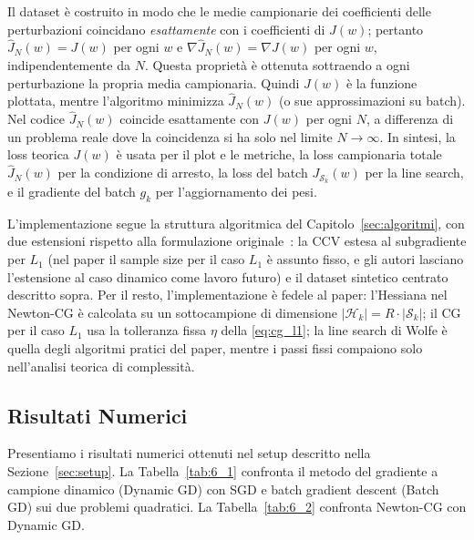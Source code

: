 \documentclass[a4paper,12pt]{article}
\numberwithin{equation}{section}
\numberwithin{figure}{section}
\numberwithin{table}{section}
\begin{document}
Il dataset è costruito in modo che le medie campionarie dei coefficienti
delle perturbazioni coincidano \emph{esattamente} con i coefficienti di
$J(w)$; pertanto $\hat J_N(w) = J(w)$ per ogni $w$ e
$\nabla \hat J_N(w) = \nabla J(w)$ per ogni $w$, indipendentemente da $N$.
Questa proprietà è ottenuta sottraendo a ogni perturbazione la propria media
campionaria. Quindi $J(w)$ è la funzione plottata, mentre l'algoritmo
minimizza $\hat J_N(w)$ (o sue approssimazioni su batch). Nel codice
$\hat J_N(w)$ coincide esattamente con $J(w)$ per ogni $N$, a differenza di
un problema reale dove la coincidenza si ha solo nel limite $N \to \infty$.
In sintesi, la loss teorica $J(w)$ è usata per il plot e le metriche, la loss
campionaria totale $\hat J_N(w)$ per la condizione di arresto, la loss del
batch $J_{\mathcal{S}_k}(w)$ per la line search, e il gradiente del batch
$g_k$ per l'aggiornamento dei pesi.

L'implementazione segue la struttura algoritmica del
Capitolo~\ref{sec:algoritmi}, con due estensioni rispetto alla formulazione
originale~\cite{byrd2012}: la CCV estesa al subgradiente per $L_1$ (nel
paper il sample size per il caso $L_1$ è assunto fisso, e gli autori
lasciano l'estensione al caso dinamico come lavoro futuro) e il dataset
sintetico centrato descritto sopra. Per il resto, l'implementazione è fedele
al paper: l'Hessiana nel Newton-CG è calcolata su un sottocampione di
dimensione $|\mathcal{H}_k| = R \cdot |\mathcal{S}_k|$; il CG per il caso
$L_1$ usa la tolleranza fissa $\eta$ della \eqref{eq:cg_l1}; la line search
di Wolfe è quella degli algoritmi pratici del paper, mentre i passi fissi
compaiono solo nell'analisi teorica di complessità.

\subsection{Risultati Numerici}\label{sec:risultati}

Presentiamo i risultati numerici ottenuti nel setup descritto nella
Sezione~\ref{sec:setup}. La Tabella~\ref{tab:6_1} confronta il metodo del
gradiente a campione dinamico (Dynamic GD) con SGD e batch gradient descent
(Batch GD) sui due problemi quadratici. La Tabella~\ref{tab:6_2} confronta
Newton-CG con Dynamic GD.
\end{document}
